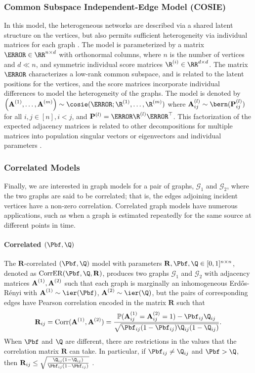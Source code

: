 \subsubsection{Common Subspace Independent-Edge Model (COSIE)} \label{sec:cosie}
In this model, the heterogeneous networks are described via a shared latent structure on the vertices, but also permits sufficient heterogeneity via individual matrices for each graph  \citep{arroyo2019inference}.
The model is parameterized by a  matrix $\V\in\RR^{n\times d}$ with orthonormal columns, 
where $n$ is the number of vertices and $d\ll n$, and  symmetric individual score matrices $\R^{(i)}\in\RR^{d\times d}$. The matrix $\V$ characterizes a low-rank common subspace, and is related to the latent positions for the vertices, and the score matrices incorporate individual differences to model the heterogeneity of the graphs. The model is denoted by $\left(\A^{(1)}, \ldots, \A^{(m)}\right)\sim \cosie(\V; \R^{(1)}, \ldots, \R^{(m)})$ where $\A_{ij}^{(l)} \sim \bern(\mathbf{P}^{(l)}_{ij})$ for all $i, j\in [n], i < j$, and $\mathbf{P}^{(l)}=\V\R^{(l)}\V^\top$. This factorization of the expected adjacency matrices is related to other decompositions for multiple matrices into population singular vectors or eigenvectors and individual parameters \citep{afshin2012enhancing,crainiceanu2011population,lock2013joint,wang2019common}.


\subsubsection{Correlated Models} \label{sec:correlated-graphs}


Finally, we are interested in graph models for a pair of graphs, $\mathcal{G}_1$ and $\mathcal{G}_2$, where the two graphs are said to be correlated; that is, the edges adjoining incident vertices have a non-zero correlation. Correlated graph models have numerous applications, such as when a graph is estimated repeatedly for the same source at different points in time.

\paragraph{Correlated $(\Pbf,\Q)$}
The $\mathbf{R}$-correlated $(\Pbf, \Q)$ model \citep{lyzinski2017matchability} with parameters $\mathbf{R}, \Pbf, \Q\in[0,1]^{n\times n}$, denoted as $\mathrm{CorrER}(\Pbf, \Q, \mathbf{R})$, produces two graphs $\mathcal{G}_1$ and $\mathcal{G}_2$ with adjacency matrices $\operatorname{\mathbf{A}}^{(1)}, \operatorname{\mathbf{A}}^{(2)}$ such that each graph is marginally an inhomogeneous Erd\H{o}s-R\'enyi with $\A^{(1)} \sim \ier(\Pbf)$, $\A^{(2)}\sim \ier(\Q)$, but the  pairs of corresponding edges have Pearson correlation  encoded in the matrix $\mathbf{R}$ such that 
$$\mathbf{R}_{ij} = \text{Corr}(\A^{(1)}, \A^{(2)})= \frac{\mathbb{P}(\A^{(1)}_{ij}=\A^{(2)}_{ij}=1)-\Pbf_{ij}\Q_{ij}}{\sqrt{\Pbf_{ij}(1-\Pbf_{ij}) \Q_{ij}(1-\Q_{ij})}}.$$
When $\Pbf$ and $\Q$ are different, there are restrictions in the values that the correlation matrix $\mathbf{R}$ can take. In particular, if $\Pbf_{ij}\neq\Q_{ij}$  and $\Pbf>\Q$, then $\mathbf{R}_{ij}\leq \sqrt{\frac{\Q_{ij}(1-\Q_{ij})}{\Pbf_{ij}(1-\Pbf_{ij})}}$ \citep{lyzinski2017matchability}.



